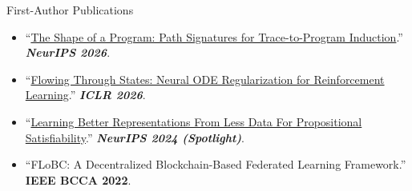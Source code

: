 \documentclass[]{mcdowellcv}
\begin{document}
	\makeheader

	\begin{cvsection}{First-Author Publications}
		\begin{cvsubsection}{}{}{}
			\begin{itemize}
				\item ``\href{https://oschart.github.io/program-signature/}{The Shape of a Program: Path Signatures for Trace-to-Program Induction}.'' \textbf{\textit{NeurIPS 2026}}.
				\item ``\href{https://arxiv.org/abs/2608.06595}{Flowing Through States: Neural ODE Regularization for Reinforcement Learning}.'' \textbf{\textit{ICLR 2026}}.
				\item ``\href{https://arxiv.org/abs/2402.08365}{Learning Better Representations From Less Data For Propositional Satisfiability}.'' \textbf{\textit{NeurIPS 2024 (Spotlight)}}.
				\item ``FLoBC: A Decentralized Blockchain-Based Federated Learning Framework.'' \textbf{IEEE BCCA 2022}.
			\end{itemize}
		\end{cvsubsection}
	\end{cvsection}
\end{document}
